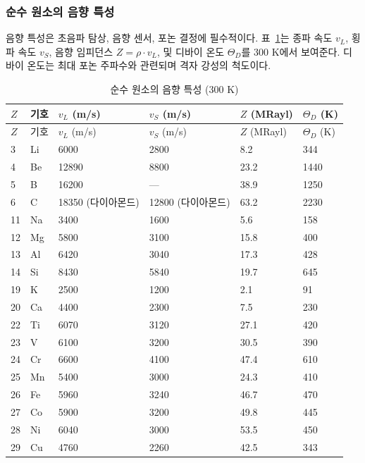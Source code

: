 \documentclass[12pt,a4paper]{article}
\begin{document}
	\subsubsection{순수 원소의 음향 특성}
	\label{subsec:acoustic-properties-func}
	
	음향 특성은 초음파 탐상, 음향 센서, 포논 결정에 필수적이다. 표~\ref{tab:acoustic-properties-func}는 종파 속도 \(v_L\), 횡파 속도 \(v_S\), 음향 임피던스 \(Z = \rho \cdot v_L\), 및 디바이 온도 \(\Theta_D\)를 300 K에서 보여준다. 디바이 온도는 최대 포논 주파수와 관련되며 격자 강성의 척도이다.
	
	\begin{longtable}{p{0.8cm}p{1.2cm}p{2.2cm}p{2.2cm}p{2.2cm}p{2.2cm}}
		\caption{순수 원소의 음향 특성 (300 K)} \label{tab:acoustic-properties-func} \\
		\toprule
		\(Z\) & 기호 & \(v_L\) (m/s) & \(v_S\) (m/s) & \(Z\) (MRayl) & \(\Theta_D\) (K) \\
		\midrule
		\endfirsthead
		\toprule
		\(Z\) & 기호 & \(v_L\) (m/s) & \(v_S\) (m/s) & \(Z\) (MRayl) & \(\Theta_D\) (K) \\
		\midrule
		\endhead
		3  & Li & 6000 & 2800 & 8.2 & 344 \\
		4  & Be & 12890 & 8800 & 23.2 & 1440 \\
		5  & B  & 16200 & --- & 38.9 & 1250 \\
		6  & C  & 18350 (다이아몬드) & 12800 (다이아몬드) & 63.2 & 2230 \\
		11 & Na & 3400 & 1600 & 5.6 & 158 \\
		12 & Mg & 5800 & 3100 & 15.8 & 400 \\
		13 & Al & 6420 & 3040 & 17.3 & 428 \\
		14 & Si & 8430 & 5840 & 19.7 & 645 \\
		19 & K  & 2500 & 1200 & 2.1 & 91 \\
		20 & Ca & 4400 & 2300 & 7.5 & 230 \\
		22 & Ti & 6070 & 3120 & 27.1 & 420 \\
		23 & V  & 6100 & 3200 & 30.5 & 390 \\
		24 & Cr & 6600 & 4100 & 47.4 & 610 \\
		25 & Mn & 5400 & 3000 & 24.3 & 410 \\
		26 & Fe & 5960 & 3240 & 46.7 & 470 \\
		27 & Co & 5900 & 3200 & 49.8 & 445 \\
		28 & Ni & 6040 & 3000 & 53.5 & 450 \\
		29 & Cu & 4760 & 2260 & 42.5 & 343 \\

\end{longtable}
\end{document}
